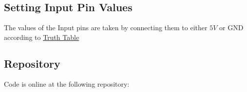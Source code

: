 \documentclass[a4paper,11pt]{article}
\begin{document}
\subsection{Setting Input Pin Values}
        The values of the Input pins are taken by connecting them to either $5V$ or GND according to \hyperref[sec:ttf]{Truth Table}
\bigskip    




\subsection{Repository}
Code is online at the following repository:
\begin{center}
    \setlength{\fboxsep}{1em}
        
    
\end{center}
\end{document}
